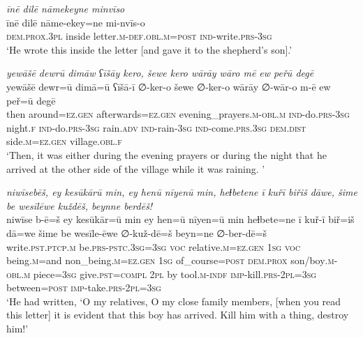 \ea \label{KŠ.57}
\textit{īnē dilē nāmekeyne minvīso} \\ 
\gll īnē dilē nāme-ekey=ne mi-nvīs-o \\ 
 \textsc{dem.prox}\textsc{.3pl} inside letter\textsc{.m}\textsc{-def}\textsc{.obl}\textsc{.m}\textsc{=\textsc{post}} \textsc{ind-}write\textsc{.prs}\textsc{-3sg} \\ 
\glt `He wrote this inside the letter [and gave it to the shepherd’s son].'
\z 
 
\ea \label{KŠ.59}
\textit{yewāšē dewrū dimāw ʕīšāy kero, šewe kero wārāy wāro mē ew peřū degē} \\ 
\gll yewāšē dewr=ū dimā=ū ʕīšā-ī ∅-ker-o šewe ∅-ker-o wārāy ∅-wār-o m-ē ew peř=ū degē \\ 
 then around\textsc{\textsc{=ez.gen}} afterwards\textsc{\textsc{=ez.gen}} evening\_prayers\textsc{.m}\textsc{-obl}\textsc{.m} \textsc{ind-}do\textsc{.prs}\textsc{-3sg} night\textsc{.f} \textsc{ind-}do\textsc{.prs}\textsc{-3sg} rain\textsc{.adv} \textsc{ind-}rain\textsc{-3sg} \textsc{ind-}come\textsc{.prs}\textsc{.3sg} \textsc{dem.dist} side\textsc{.m}\textsc{\textsc{=ez.gen}} village\textsc{.obl}\textsc{.f} \\ 
\glt `Then, it was either during the evening prayers or during the night that he arrived at the other side of the village while it was raining. '
\z 
 
\ea \label{KŠ.72}
\textit{niwīsebēš, ey kesūkārū min, ey henū nīyenū min, heɫbetene ī kuřī biřiš dāwe, šime be wesīlēwe kuždēš, beynne berdēš!} \\ 
\gll niwīse b-ē=š ey kesūkār=ū min ey hen=ū nīyen=ū min heɫbete=ne ī kuř-ī biř=iš dā=we šime be wesīle-ēwe ∅-kuž-dē=š beyn=ne ∅-ber-dē=š \\ 
 write\textsc{.pst}\textsc{.ptcp}\textsc{.m} be\textsc{.prs}\textsc{-pstc}\textsc{.3sg}\textsc{=3sg} \textsc{voc} relative\textsc{.m}\textsc{\textsc{=ez.gen}} \textsc{1sg} \textsc{voc} being\textsc{.m}=and non\_being\textsc{.m}\textsc{\textsc{=ez.gen}} \textsc{1sg} of\_course\textsc{=\textsc{post}} \textsc{dem.prox} son/boy\textsc{.m}\textsc{-obl}\textsc{.m} piece\textsc{=3sg} give\textsc{.pst}\textsc{=compl} \textsc{2pl} by tool\textsc{.m}\textsc{-indf} \textsc{imp-}kill\textsc{.prs}-\textsc{2pl}\textsc{=3sg} between\textsc{=\textsc{post}} \textsc{imp-}take\textsc{.prs}-\textsc{2pl}\textsc{=3sg} \\ 
\glt `He had written, ‘O my relatives, O my close family members, [when you read this letter] it is evident that this boy has arrived. Kill him with a thing, destroy him!'
\z 
 
